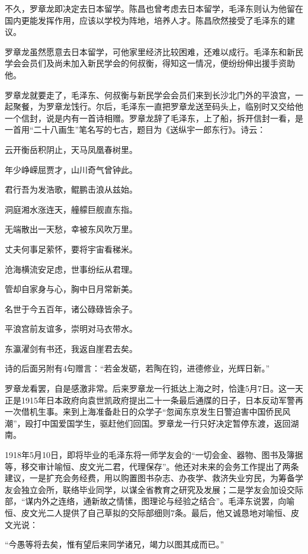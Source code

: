 \documentclass[../../dazhuan.tex]{subfiles}
\begin{document}
不久，罗章龙即决定去日本留学。陈昌也曾考虑去日本留学，毛泽东则认为他留在国内更能发挥作用，应该以学校为阵地，培养人才。陈昌欣然接受了毛泽东的建议。

罗章龙虽然愿意去日本留学，可他家里经济比较困难，还难以成行。毛泽东和新民学会会员们及尚未加入新民学会的何叔衡，得知这一情况，便纷纷伸出援手资助他。

罗章龙就要走了，毛泽东、何叔衡与新民学会会员们来到长沙北门外的平浪宫，一起聚餐，为罗章龙饯行。尔后，毛泽东一直把罗章龙送至码头上，临别时又交给他一个信封，说是内有一首诗相赠。罗章龙辞了毛泽东，上了船，拆开信封一看，是一首用“二十八画生”笔名写的七古，题目为《送纵宇一郎东行》。诗云：

\begin{couplet}
云开衡岳积阴止，天马凤凰春树里。

年少峥嵘屈贾才，山川奇气曾钟此。

君行吾为发浩歌，鲲鹏击浪从兹始。

洞庭湘水涨连天，艟艨巨舰直东指。

无端散出一天愁，幸被东风吹万里。

丈夫何事足萦怀，要将宇宙看稊米。

沧海横流安足虑，世事纷纭从君理。

管却自家身与心，胸中日月常新美。

名世于今五百年，诸公碌碌皆余子。

平浪宫前友谊多，崇明对马衣带水。

东瀛濯剑有书还，我返自崖君去矣。\end{couplet}

诗的后面另附有4句赠言：“若金发砺，若陶在钧，进德修业，光辉日新。”

罗章龙看罢，自是感激非常。后来罗章龙一行抵达上海之时，恰逢5月7日。这一天正是1915年日本政府向袁世凯政府提出二十一条最后通牒的日子，日本反动军警再一次借机生事。来到上海准备赴日的众学子“忽闻东京发生日警迫害中国侨民风潮”，殴打中国爱国学生，驱赶他们回国。罗章龙一行只好决定暂停东渡，返回湖南。

1918年5月10日，即将毕业的毛泽东将一师学友会的“一切会金、器物、图书及簿据等，移交审计喻恒、皮文光二君，代理保存”。他还对未来的会务工作提出了两条建议，一是扩充会务经费，用以购置图书杂志、办夜学、救济失业穷民，为筹备学友会独立会所，联络毕业同学，以谋全省教育之研究及发展；二是学友会加设交际部，“谋内外之连络，通新故之情愫，图理论与经验之结合”。毛泽东说罢，向喻恒、皮文光二人提供了自己草拟的交际部细则7条。最后，他又诚恳地对喻恒、皮文光说：

“今愚等将去矣，惟有望后来同学诸兄，竭力以图其成而已。”
\end{document}
